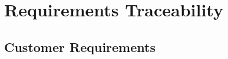 \documentclass[12pt, oneside, letterpaper]{report}
\begin{document}
\chapter{Requirements Traceability}
		\section{Customer Requirements}
			
			
			
			
			
			
			
			
			
			


\begin{comment}
\part{Systems and Software Requirements Specification (SSRS) \\ for \\ Hatch}

\chapter{Overall Description}


	\section{Product Perspective}
		
	\section{Product Functions}
		
	\section{User Characteristics}
		
	\section{Constraints}
		
	\section{Assumptions and Dependencies}
		

\end{comment}
\end{document}
